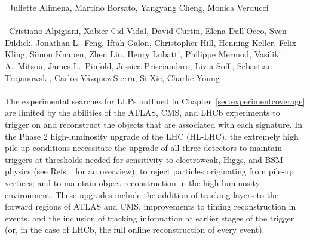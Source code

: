 

~Juliette Alimena, Martino Borsato, Yangyang Cheng, Monica Verducci\\
\text{ \; }\\
~Cristiano Alpigiani, Xabier Cid Vidal, David Curtin, Elena Dall'Occo, Sven Dildick, Jonathan L.~Feng, Iftah Galon, Christopher Hill, Henning Keller, Felix Kling, Simon Knapen, Zhen Liu, Henry Lubatti, Philippe Mermod, Vasiliki A.\ Mitsou, James L.~Pinfold, Jessica Prisciandaro, Livia Soffi, Sebastian Trojanowski, Carlos V\'azquez Sierra, Si Xie, Charlie Young\\
\text{ \; }\\

\noindent The experimental searches for LLPs outlined in Chapter~\ref{sec:experimentcoverage} are limited by the abilities of the ATLAS, CMS, and LHCb experiments to trigger on and reconstruct the objects that are associated with each signature. In the Phase 2 high-luminosity upgrade of the LHC (HL-LHC), the extremely high pile-up conditions necessitate the upgrade of all three detectors to maintain triggers at thresholds needed for sensitivity to electroweak, Higgs, and BSM physics (see
Refs.~\cite{Schmidt:2016jra,Apollinari:2015bam} for an overview); to reject particles originating from pile-up vertices; and to maintain object reconstruction in the high-luminosity environment. These upgrades include the addition of tracking layers to the forward regions of ATLAS and CMS, improvements to timing reconstruction in events, and the inclusion of tracking information at earlier stages of the trigger (or, in the case of LHCb, the full online reconstruction of every event).

